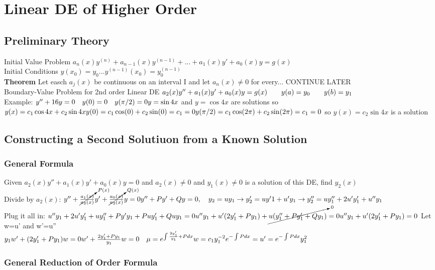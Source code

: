 \documentclass{article}
\begin{document}
\section{Linear DE of Higher Order}
\subsection{Preliminary Theory}
Initial Value Problem $a_n(x)y^{(n)}+a_{n-1}(x)y^{(n-1)}+...+a_1(x)y'+a_0(x)y=g(x)$
\\Initial Conditions $y(x_0)=y_0...y^{(n-1)}(x_0)=y_0^{(n-1)}$
\\\textbf{Theorem} Let easch $a_j(x)$ be continuous on an interval I and let $a_n(x)\neq 0$ for every... CONTINUE LATER
\\Boundary-Value Problem for 2nd order Linear DE $a_2(x)y''+a_1(x)y'+a_0(x)y=g(x)\\  \qquad y(a)=y_0 \qquad y(b)=y_1$
\\Example: $y''+16y=0 \quad y(0)=0 \quad y(\pi/2) = 0
\\y=\sin 4x$ and $y=\cos 4x$ are solutions so $y(x)=c_1\cos 4x+ c_2 \sin 4x
\\y(0) = c_1\cos(0)+c_2\sin(0) =c_1= 0
\\y(\pi/2) = c_1\cos(2\pi)+c_2\sin(2\pi) =c_1= 0
$ so $y(x)=c_2\sin 4x$ is a solution

\subsection{Constructing a Second Solutiuon from a Known Solution}

\subsubsection*{General Formula} Given $a_2(x)y''+a_1(x)y'+a_0(x)y=0$ and $a_2(x) \neq 0$ and $y_1(x) \neq 0$ is a solution of this DE, find $y_2(x)$
\\Divide by $a_2(x)$: $y''+\cancelto{P(x)}{\frac{a_1(x)}{a_2(x)}}y'+\cancelto{Q(x)}{\frac{a_0(x)}{a_2(x)}}y=0
\\y''+Py'+Qy=0, \quad y_2=uy_1 \rightarrow y_2'=uy'1+u'y_1 \rightarrow y_2''=uy_1''+2u'y_1'+u''y_1$ 
\\Plug it all in: $u''y_1+2u'y_1'+uy_1''+Py'y_1+Puy_1'+Quy_1=0
\\u''y_1+u'(2y_1'+Py_1)+\cancelto{0}{u(y_1''+Py_1'+Qy_1)}=0
\\u''y_1+u'(2y_1'+Py_1)=0$ Let w=u' and w'=u''
\\$y_1w'+(2y_1'+Py_1)w=0
\\ w'+\frac{2y_1'+Py_1}{y_1}w=0 \quad \mu = e^{\int \frac{2y_1'}{y_1}+P dx}
\\w=c_1y_1^{-2}e^{-\int P dx}=u' = {e^{-\int P dx}}{y_1^2}$
\\\subsubsection*{General Reduction of Order Formula} 
\end{document}
